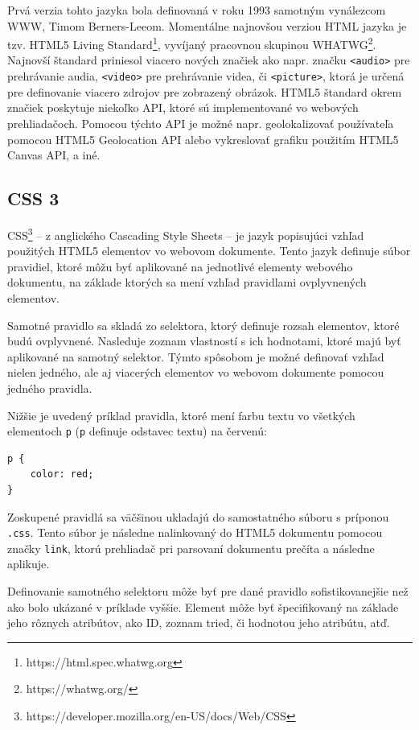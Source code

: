 Prvá verzia tohto jazyka bola definovaná v roku 1993 samotným vynálezcom WWW, Timom Berners-Leeom. Momentálne najnovšou verziou HTML jazyka je tzv. HTML5 Living Standard\footnote{https://html.spec.whatwg.org}, vyvíjaný pracovnou skupinou \newline WHATWG\footnote{https://whatwg.org/}. Najnovší štandard priniesol viacero nových značiek ako napr. značku \texttt{<audio>} pre prehrávanie audia, \texttt{<video>} pre prehrávanie videa, či \texttt{<picture>}, ktorá je určená pre definovanie viacero zdrojov pre zobrazený obrázok. HTML5 štandard okrem značiek poskytuje niekoľko API, ktoré sú implementované vo webových prehliadačoch. Pomocou týchto API je možné napr. geolokalizovať používateľa pomocou HTML5 Geolocation API alebo vykreslovať grafiku použitím HTML5 Canvas API, a iné.

\subsection {CSS 3}
CSS\footnote{https://developer.mozilla.org/en-US/docs/Web/CSS} -- z anglického Cascading Style Sheets -- je jazyk popisujúci vzhľad použitých HTML5 elementov vo webovom dokumente. Tento jazyk definuje súbor pravidiel, ktoré môžu byť aplikované na jednotlivé elementy webového dokumentu, na základe ktorých sa mení vzhľad pravidlami ovplyvnených elementov.

Samotné pravidlo sa skladá zo selektora, ktorý definuje rozsah elementov, ktoré budú ovplyvnené. Nasleduje zoznam vlastností s ich hodnotami, ktoré majú byť aplikované na samotný selektor. Týmto spôsobom je možné definovať vzhľad nielen jedného, ale aj viacerých elementov vo webovom dokumente pomocou jedného pravidla.

Nižšie je uvedený príklad pravidla, ktoré mení farbu textu vo všetkých elementoch \texttt{p} (\texttt{p} definuje odstavec textu) na červenú:

\begin{verbatim}
p {
    color: red;
}
\end{verbatim}

Zoskupené pravidlá sa väčšinou ukladajú do samostatného súboru s príponou \texttt{.css}. Tento súbor je následne nalinkovaný do HTML5 dokumentu pomocou značky \texttt{link}, ktorú prehliadač pri parsovaní dokumentu prečíta a následne aplikuje.

Definovanie samotného selektoru môže byť pre dané pravidlo sofistikovanejšie než ako bolo ukázané v príklade vyššie. Element môže byť špecifikovaný na základe jeho rôznych atribútov, ako ID, zoznam tried, či hodnotou jeho atribútu, atď.

